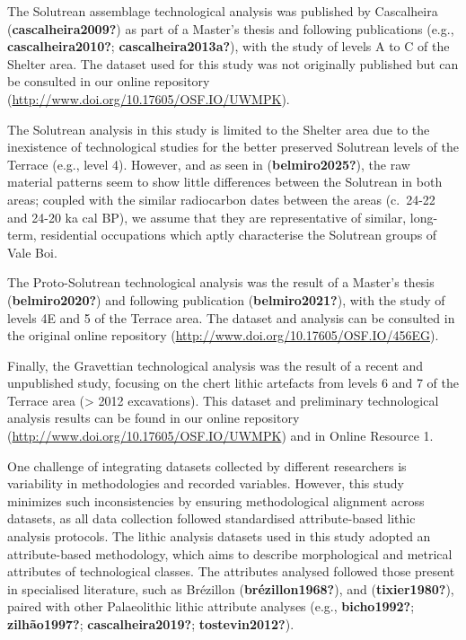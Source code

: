 \documentclass[
  a4paper,
  DIV=11,
  numbers=noendperiod]{scrreprt}
\begin{document}
The Solutrean assemblage technological analysis was published by
Cascalheira (\textbf{cascalheira2009?}) as part of a Master's thesis and
following publications (e.g., \textbf{cascalheira2010?};
\textbf{cascalheira2013a?}), with the study of levels A to C of the
Shelter area. The dataset used for this study was not originally
published but can be consulted in our online repository
(\url{http://www.doi.org/10.17605/OSF.IO/UWMPK}).

The Solutrean analysis in this study is limited to the Shelter area due
to the inexistence of technological studies for the better preserved
Solutrean levels of the Terrace (e.g., level 4). However, and as seen in
(\textbf{belmiro2025?}), the raw material patterns seem to show little
differences between the Solutrean in both areas; coupled with the
similar radiocarbon dates between the areas (c.~24-22 and 24-20 ka cal
BP), we assume that they are representative of similar, long-term,
residential occupations which aptly characterise the Solutrean groups of
Vale Boi.

The Proto-Solutrean technological analysis was the result of a Master's
thesis (\textbf{belmiro2020?}) and following publication
(\textbf{belmiro2021?}), with the study of levels 4E and 5 of the
Terrace area. The dataset and analysis can be consulted in the original
online repository (\url{http://www.doi.org/10.17605/OSF.IO/456EG}).

Finally, the Gravettian technological analysis was the result of a
recent and unpublished study, focusing on the chert lithic artefacts
from levels 6 and 7 of the Terrace area (\textgreater{} 2012
excavations). This dataset and preliminary technological analysis
results can be found in our online repository
(\url{http://www.doi.org/10.17605/OSF.IO/UWMPK}) and in Online Resource
1.

One challenge of integrating datasets collected by different researchers
is variability in methodologies and recorded variables. However, this
study minimizes such inconsistencies by ensuring methodological
alignment across datasets, as all data collection followed standardised
attribute-based lithic analysis protocols. The lithic analysis datasets
used in this study adopted an attribute-based methodology, which aims to
describe morphological and metrical attributes of technological classes.
The attributes analysed followed those present in specialised
literature, such as Brézillon (\textbf{brézillon1968?}), and
(\textbf{tixier1980?}), paired with other Palaeolithic lithic attribute
analyses (e.g., \textbf{bicho1992?}; \textbf{zilhão1997?};
\textbf{cascalheira2019?}; \textbf{tostevin2012?}).
\end{document}
